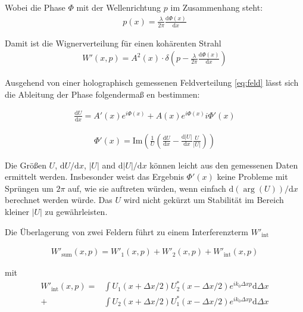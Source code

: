 \documentclass{article}
\newcommand{\trmd}{\textrm{d}}
\begin{document}
Wobei die Phase $\Phi$ mit der Wellenrichtung $p$ im Zusammenhang steht:
\begin{align}
  p(x) = \frac{\lambda}{2\pi} \frac{\textrm{d} \Phi(x)}{\textrm{d} x}
\end{align}

Damit ist die Wignerverteilung f\"ur einen koh\"arenten Strahl
\begin{align}
  W'(x,p)= A^2(x) \cdot \delta\left(p-\frac{\lambda}{2\pi}
    \frac{\textrm{d} \Phi(x)}{\textrm{d} x}\right)
\end{align}

Ausgehend von einer holographisch gemessenen Feldverteilung
\eqref{eq:feld} l\"asst sich die Ableitung der Phase folgenderma\ss
en bestimmen:

\begin{align}
  \frac{\trmd U}{\trmd x} = A'(x) e^{i\Phi(x)} + A(x) e^{i\Phi(x)} i \Phi'(x)
\end{align}

\begin{align}
  \Phi'(x) = \textrm{Im}\left(\frac{1}{U}\left(\frac{\trmd U}{\trmd x} -  \frac{\trmd |U|}{\trmd x} \frac{U}{| U |}\right)\right) 
\end{align}

Die Gr\"o\ss en $U$, $\trmd U / \trmd x$, $|U|$ and $\trmd |U| / \trmd
x$ k\"onnen leicht aus den gemessenen Daten ermittelt
werden. Insbesonder weist das Ergebnis $\Phi'(x)$ keine Probleme mit
Spr\"ungen um $2\pi$ auf, wie sie auftreten w\"urden, wenn einfach
$\trmd(\arg(U))/\trmd x$ berechnet werden w\"urde. Das $U$ wird nicht
gek\"urzt um Stabilit\"at im Bereich kleiner $|U|$ zu gew\"ahrleisten.


Die \"Uberlagerung von zwei Feldern f\"uhrt zu einem Interferenzterm
$W'_\textrm{int}$

\begin{align}
  W'_\textrm{sum}(x,p) = W'_1(x,p) + W'_2(x,p) + W'_\textrm{int} (x,p)
\end{align}

mit 
\begin{align}
  W'_\textrm{int} (x,p) = 
  &\int U_1(x+\Delta x/2)  U^*_2(x-\Delta x/2) e^{i k_0 \Delta x p} \textrm{d} \Delta x \\
  + &\int U_2(x+\Delta x/2)  U^*_1(x-\Delta x/2) e^{i k_0 \Delta x p} \textrm{d} \Delta x
\end{align}
\end{document}
